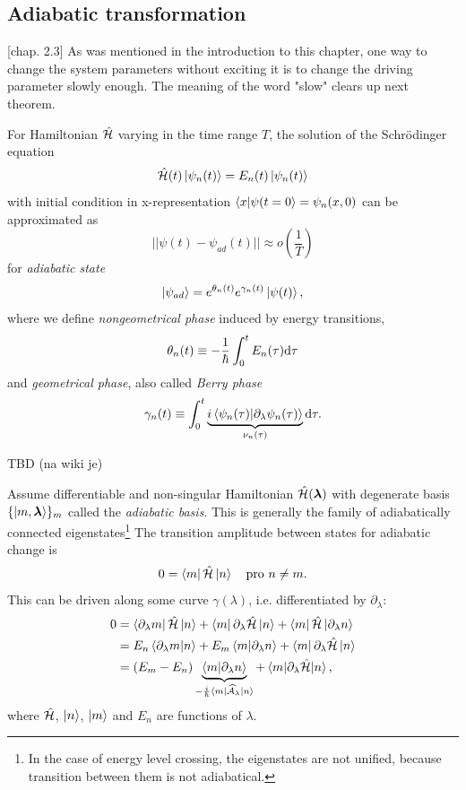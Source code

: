 \subsection{Adiabatic transformation}
\citep{kolodrubez}[chap. 2.3]
As was mentioned in the introduction to this chapter, one way to change the system parameters without exciting it is to change the driving parameter slowly enough. The meaning of the word "slow" clears up next theorem.
\begin{thm}
    \label{adiabaticTheorem}
    For Hamiltonian $\hat{\mathcal{H}}$ varying in the time range $T$, the solution of the Schrödinger equation 
    $$\hat{\mathcal{H}}(t)\ket{\psi_n(t)} = E_n(t)\ket{\psi_n(t)}$$
    with initial condition in x-representation $\braket{x|\psi(t=0}=\psi_n(x,0)$ can be approximated as
    \begin{equation}
      ||\psi(t) - \psi_{ad}(t)||\approx o\left(\frac{1}{T}\right)
    \end{equation}
    for \emph{adiabatic state}
    \begin{equation}
        \ket{\psi_{ad}}= e^{\theta_n(t)}e^{\gamma_n(t)}\ket{\psi(t)},
    \end{equation}
    where we define \emph{nongeometrical phase} induced by energy transitions,
    $$\theta_n(t)\equiv -\frac{1}{\hbar}\int_0^t E_n(\tau)\mathrm{d} \tau$$
    and \emph{geometrical phase}, also called \emph{Berry phase}
        $$\gamma_n(t)\equiv \int_0^t \underbrace{i\braket{\psi_n(\tau)|\partial_\lambda\psi_n(\tau)}}_{\nu_n(\tau)} \mathrm{d} \tau .$$
\end{thm}
\begin{myproof}
    TBD (na wiki je)
\end{myproof}
Assume differentiable and non-singular Hamiltonian $\hat{\mathcal{H}}({\bm\lambda})$ with degenerate basis $\{\ket{m,{\bm\lambda}}\}_m$ called the \emph{adiabatic basis}. This is generally the family of adiabatically connected eigenstates\footnote{In the case of energy level crossing, the eigenstates are not unified, because transition between them is not adiabatical.} The transition amplitude between states for adiabatic change is
\begin{equation}
    0=\bra{m}\hat{\mathcal{H}}\ket{n} \quad \text{pro }n\neq m.
\end{equation}
This can be driven along some curve $\gamma(\lambda)$, i.e. differentiated by $\partial_\lambda$:
\begin{equation}
    \begin{split}
        0&=\bra{\partial_\lambda m}\hat{\mathcal{H}}\ket{n}+ \bra{m}\partial_\lambda\hat{\mathcal{H}}\ket{n}+ \bra{m}\hat{\mathcal{H}}\ket{\partial_\lambda n}\\
        &=E_n\braket{\partial_\lambda m|n} + E_m\braket{m|\partial_\lambda n}+ \bra{m}\partial_\lambda \hat{\mathcal{H}}\ket{n}\\
        &= (E_m-E_n)\underbrace{\braket{m|\partial_\lambda n}}_{-\frac{i}{\hbar}\bra{m}\mathcal{\widehat{A}}_\lambda\ket{n}} + \braket{m|\partial_\lambda\hat{\mathcal{H}}|n},
    \end{split}
\end{equation}
where $\hat{\mathcal{H}}$, $\ket{n}$, $\ket{m}$ and $E_n$ are functions of $\lambda$.

